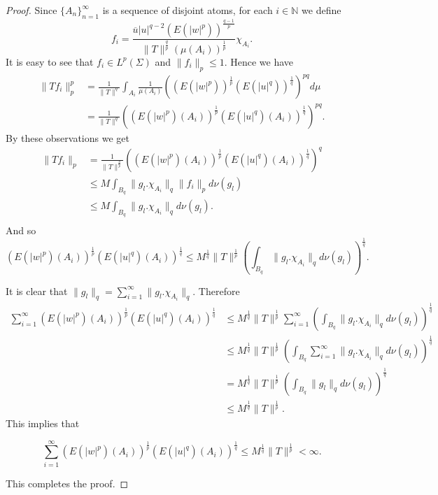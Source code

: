 \documentclass{amsart}
\theoremstyle{definition}\newtheorem{defn}[thm]{Definition}
\theoremstyle{remark}
\numberwithin{equation}{section}
\begin{document}
\begin{proof}
Since $\{A_n\}^{\infty}_{n=1}$ is a sequence of disjoint atoms, for each $i\in \mathbb{N}$ we define
$$f_i=\frac{\overline{u}|u|^{q-2}(E(|w|^{p}))^{\frac{q-1}{p}}}{\|T\|^{\frac{q}{p}} (\mu(A_{i}))^{\frac{1}{p}}}\chi_{A_{i}}.$$
It is easy to see that $f_i\in L^p(\Sigma)$ and $\|f_i\|_p\leq 1$. Hence we have
\begin{align*}
\|Tf_i\|^p_p&=\frac{1}{\|T\|^{q}}\int_{A_i}\frac{1}{\mu(A_{i})}\left((E(|w|^{p}))^{\frac{1}{p}}(E(|u|^{q}))^{\frac{1}{q}}\right)^{pq}d\mu\\
&=\frac{1}{\|T\|^{q}}\left((E(|w|^{p})(A_i))^{\frac{1}{p}}(E(|u|^{q})(A_i))^{\frac{1}{q}}\right)^{pq}.
\end{align*}
By these observations we get 
\begin{align*}
\|Tf_i\|_p&=\frac{1}{\|T\|^{\frac{q}{p}}}\left((E(|w|^{p})(A_i))^{\frac{1}{p}}(E(|u|^{q})(A_i))^{\frac{1}{q}}\right)^{q}\\
&\leq M\int_{B_q}\|g_l.\chi_{A_i}\|_q\|f_i\|_pd\nu(g_l)\\
&\leq  M\int_{B_q}\|g_l.\chi_{A_i}\|_qd\nu(g_l).\\
\end{align*}
And so 
$$(E(|w|^{p})(A_i))^{\frac{1}{p}}(E(|u|^{q})(A_i))^{\frac{1}{q}}\leq M^{\frac{1}{q}}\|T\|^{\frac{1}{p}}\left(\int_{B_q}\|g_l.\chi_{A_i}\|_qd\nu(g_l)\right)^{\frac{1}{q}}.$$

It is clear that $\|g_l\|_q=\sum^{\infty}_{i=1}\|g_l.\chi_{A_i}\|_q$. Therefore
\begin{align*}
\sum^{\infty}_{i=1}(E(|w|^{p})(A_i))^{\frac{1}{p}}(E(|u|^{q})(A_i))^{\frac{1}{q}}&\leq M^{\frac{1}{q}}\|T\|^{\frac{1}{p}}\sum^{\infty}_{i=1}\left(\int_{B_q}\|g_l.\chi_{A_i}\|_qd\nu(g_l)\right)^{\frac{1}{q}}\\
&\leq M^{\frac{1}{q}}\|T\|^{\frac{1}{p}}\left(\int_{B_q}\sum^{\infty}_{i=1}\|g_l.\chi_{A_i}\|_qd\nu(g_l)\right)^{\frac{1}{q}}\\
&=M^{\frac{1}{q}}\|T\|^{\frac{1}{p}}\left(\int_{B_q}\|g_l\|_qd\nu(g_l)\right)^{\frac{1}{q}}\\
&\leq M^{\frac{1}{q}}\|T\|^{\frac{1}{p}}.
\end{align*}
This implies that 

$$\sum^{\infty}_{i=1}(E(|w|^{p})(A_i))^{\frac{1}{p}}(E(|u|^{q})(A_i))^{\frac{1}{q}}\leq M^{\frac{1}{q}}\|T\|^{\frac{1}{p}}<\infty.$$

This completes the proof.
\end{proof}
\end{document}
